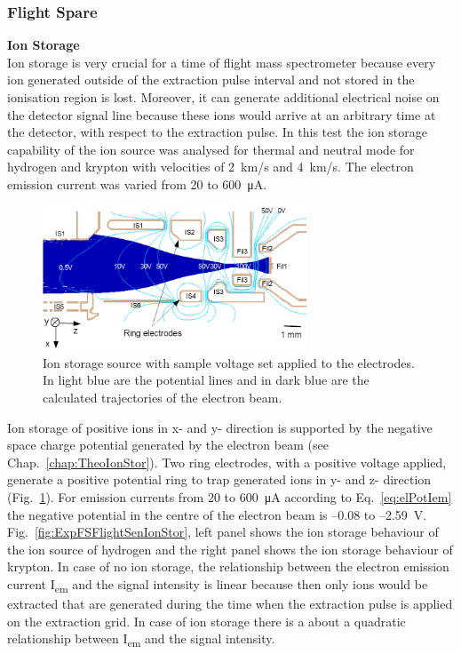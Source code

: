 		\subsubsection{Flight Spare}\label{chap:FSCalib}
		\textbf{Ion Storage}\\
		Ion storage is very crucial for a time of flight mass spectrometer because every ion generated outside of the extraction pulse interval and not stored in the ionisation region is lost. Moreover, it can generate additional electrical noise on the detector signal line because these ions would arrive at an arbitrary time at the detector, with respect to the extraction pulse. In this test the ion storage capability of the ion source was analysed for thermal and neutral mode for hydrogen and krypton with velocities of 2~km/s and 4~km/s. The electron emission current was varied from 20 to 600~\si{\micro\ampere}.
		\begin{figure}[H]
			\centering
			\includegraphics[width = 0.7\textwidth]{Experiments/FiL_IS_elBeam_Storage.png}
			\caption{Ion storage source with sample voltage set applied to the electrodes. In light blue are the potential lines and in dark blue are the calculated trajectories of the electron beam.}
			\label{fig:ExpFSFlightSenIonStorIS}
		\end{figure}
		Ion storage of positive ions in x- and y- direction is supported by the negative space charge potential generated by the electron beam (see Chap.~\ref{chap:TheoIonStor}). Two ring electrodes, with a positive voltage applied, generate a positive potential ring to trap generated ions in y- and z- direction (Fig.~\ref{fig:ExpFSFlightSenIonStorIS}). For emission currents from 20 to 600~\si{\micro\ampere} according to Eq.~\eqref{eq:elPotIem} the negative potential in the centre of the electron beam is --0.08 to --2.59~V. Fig.~\ref{fig:ExpFSFlightSenIonStor}, left panel shows the ion storage behaviour of the ion source of hydrogen and the right panel shows the ion storage behaviour of krypton. In case of no ion storage, the relationship between the electron emission current I\textsubscript{em} and the signal intensity is linear because then only ions would be extracted that are generated during the time when the extraction pulse is applied on the extraction grid. In case of ion storage there is a about a quadratic relationship between I\textsubscript{em} and the signal intensity.\\
